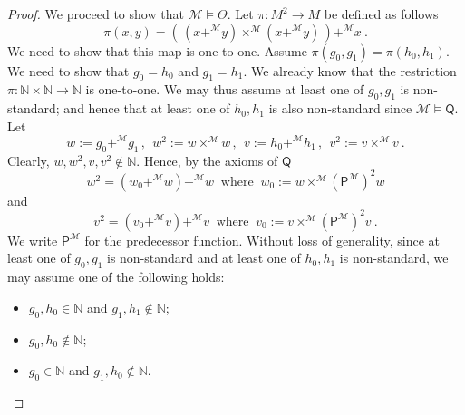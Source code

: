 \documentclass[10pt,a4paper, openany,  oldfontcommands]{memoir}
\newtheorem{open problem} [theorem] {Open Problem}
\newtheorem{open question} [theorem] {Open Question}
\renewcommand{\mathrm}{\mathsf}
\begin{document}
\begin{proof}
We proceed to show that   $   \mathcal{M}     \models  \Theta   $.
Let     $   \pi   :  M^2  \to  M  $  be defined  as follows
\[
  \pi  (x,y) =  \left(    \,   (x +^{  \mathcal{M} }   y)    \times^{  \mathcal{M}  }  ( x +^{  \mathcal{M}  } y)    \,  \right)   +^{  \mathcal{M}  } x  
  \      .
  \]
  We need to show that this map is one-to-one. 
Assume $   \pi ( g_0, g_1) =  \pi ( h_0, h_1) $.  
We need to show that $ g_0 = h_0 $  and $ g_1 = h_1  $.
We already know that  the restriction  $   \pi   :  \mathbb{N} \times   \mathbb{N}  \to   \mathbb{N} $  is one-to-one. 
We may  thus assume at least  one of  $  g_0, g_1 $ is non-standard; 
and hence that  at least  one of $h_0, h_1 $  is also non-standard   since  $  \mathcal{M}   \models  \mathsf{Q} $.
Let  
\[
 w :=      g_0 +^{  \mathcal{M} }   g_1
 \,  ,   \   \   
  w^2 := w  \times^{  \mathcal{M}  }   w 
   \,  ,   \   \   
  v :=      h_0 +^{  \mathcal{M} }   h_1 
   \,  ,   \   \   
 v^2 := v  \times^{  \mathcal{M}  }   v  
  \      .
\]
Clearly,  $ w, w^2 , v  , v^2 \not\in  \mathbb{N} $. 
Hence, by the axioms of  $  \mathsf{Q} $
\[
w^2  =  \left( w_0   +^{  \mathcal{M} }  w   \right)     +^{  \mathcal{M} }   w 
\     \mbox{ where  }    \   
w_0 :=  w  \times^{  \mathcal{M}  }   \left(  \mathrm{P}^{   \mathcal{M} }  \right)^2  w  
\]
and 
\[
v^2  =  \left( v_0   +^{  \mathcal{M} }  v   \right)     +^{  \mathcal{M} }   v 
\     \mbox{ where  }    \   
v_0 :=  v  \times^{  \mathcal{M}  }   \left(  \mathrm{P}^{   \mathcal{M} }  \right)^2  v  
\      .
\]
We write   $   \mathrm{P}^{   \mathcal{M} } $ for  the predecessor function. 
Without loss of generality, since at least one of $ g_0, g_1 $  is non-standard and  at   least one of $ h_0, h_1 $  is non-standard, 
we  may assume one of the following holds: 
\begin{itemize}
\item[(I)]   $  g_0, h_0  \in   \mathbb{N} $  and    $  g_1, h_1  \not\in   \mathbb{N} $; 

\item[(II)]    $  g_0, h_0  \not\in   \mathbb{N} $; 


\item[(III)]    $ g_0  \in  \mathbb{N} $  and  $  g_1,   h_0  \not\in  \mathbb{N}  $. 
\end{itemize}










\end{proof}
\end{document}
